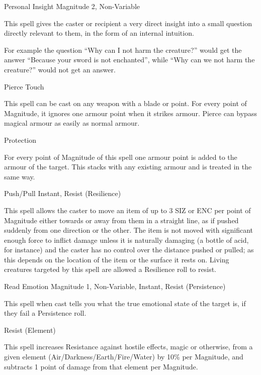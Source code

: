 \begin{rpg-spell}
{Personal Insight}
{Magnitude 2, Non-Variable}

This spell gives the caster or recipient a very direct insight into a small question directly relevant to them, in the form of an internal intuition.

For example the question “Why can I not harm the creature?” would get the answer “Because your sword is not enchanted”, while “Why can we not harm the creature?” would not get an answer.
\end{rpg-spell}


\begin{rpg-spell}
{Pierce}
{Touch}

This spell can be cast on any weapon with a blade or point. For every point of Magnitude, it ignores one armour point when it strikes armour. Pierce can bypass magical armour as easily as normal armour. 
\end{rpg-spell}


\begin{rpg-spell}
{Protection}
{}

For every point of Magnitude of this spell one armour point is added to the armour of the target. This stacks with any existing armour and is treated in the same way. 
\end{rpg-spell}


\begin{rpg-spell}
{Push/Pull}
{Instant, Resist (Resilience)}

This spell allows the caster to move an item of up to 3 SIZ or ENC per point of Magnitude either towards or away from them in a straight line, as if pushed suddenly from one direction or the other. The item is not moved with significant enough force to inflict damage unless it is naturally damaging (a bottle of acid, for instance) and the caster has no control over the distance pushed or pulled; as this depends on the location of the item or the surface it rests on. Living creatures targeted by this spell are allowed a Resilience roll to resist.
\end{rpg-spell}


\begin{rpg-spell}
{Read Emotion}
{Magnitude 1, Non-Variable, Instant, Resist (Persistence)}

This spell when cast tells you what the true emotional state of the target is, if they fail a Persistence roll.
\end{rpg-spell}


\begin{rpg-spell}
{Resist (Element)}
\nopagebreak
{}

This spell increases Resistance against hostile effects, magic or otherwise, from a given element (Air/Darkness/Earth/Fire/Water) by 10\% per Magnitude, and subtracts 1 point of damage from that element per Magnitude.
\end{rpg-spell}


